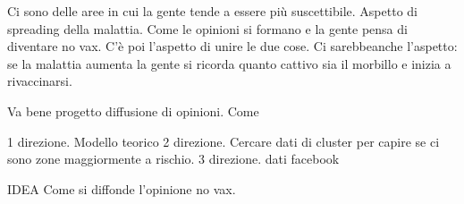\documentclass[../main/main.tex]{subfiles}
\begin{document}

Ci sono delle aree in cui la gente tende a essere più suscettibile. Aspetto di spreading della malattia. Come le opinioni si formano e la gente pensa di diventare no vax. C'è poi l'aspetto di unire le due cose. Ci sarebbeanche l'aspetto: se la malattia aumenta la gente si ricorda quanto cattivo sia il morbillo e inizia a rivaccinarsi.

Va bene progetto diffusione di opinioni. Come

1 direzione. Modello teorico
2 direzione. Cercare dati di cluster per capire se ci sono zone maggiormente a rischio.
3 direzione. dati facebook

IDEA
Come si diffonde l'opinione no vax. 
\end{document}
